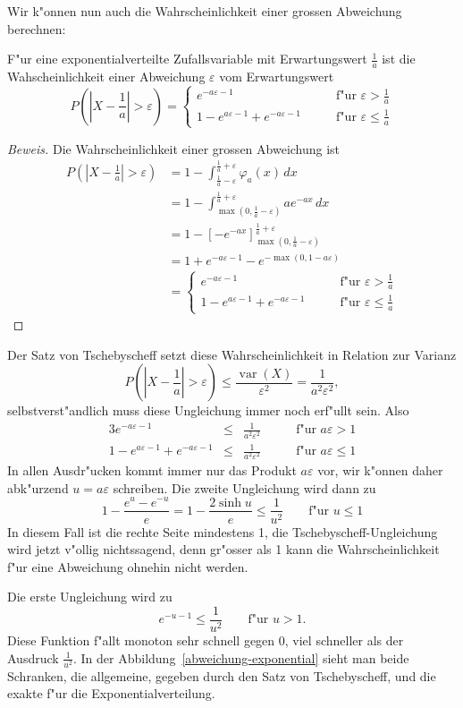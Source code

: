 {
\small
Wir k"onnen nun auch die Wahrscheinlichkeit einer grossen Abweichung
berechnen:
\begin{satz} F"ur eine exponentialverteilte Zufallsvariable mit
Erwartungswert $\frac1a$ ist die Wahscheinlichkeit einer Abweichung
$\varepsilon$ vom Erwartungswert
\[
P(|X-{\textstyle\frac1a}|>\varepsilon)=
\begin{cases}
e^{-a\varepsilon-1}&\qquad\text{f"ur $\varepsilon > \frac1a$}\\
1-e^{a\varepsilon-1}+e^{-a\varepsilon-1}&\qquad\text{f"ur $\varepsilon \le \frac1a$}
\end{cases}
\]
\end{satz}
\begin{proof}[Beweis]
Die Wahrscheinlichkeit einer grossen Abweichung ist
\begin{align*}
P(|X-{\textstyle\frac1a}|>\varepsilon)
&=1-\int_{\frac1a-\varepsilon}^{\frac1a+\varepsilon}\varphi_a(x)\,dx\\
&=1-\int_{\max(0,\frac1a-\varepsilon)}^{\frac1a+\varepsilon}ae^{-ax}\,dx\\
&=1-\left[-e^{-ax}\right]_{\max(0,\frac1a-\varepsilon)}^{\frac1a+\varepsilon}\\
&=1+e^{-a\varepsilon-1}-e^{-\max(0,1-a\varepsilon)}\\
&=\begin{cases}
e^{-a\varepsilon-1}&\qquad\text{f"ur $\varepsilon > \frac1a$}\\
1-e^{a\varepsilon-1}+e^{-a\varepsilon-1}&\qquad\text{f"ur $\varepsilon \le \frac1a$}
\end{cases}
\end{align*}
\end{proof}
Der Satz von Tschebyscheff setzt diese Wahrscheinlichkeit in Relation
zur Varianz
\[
P(|X-{\textstyle\frac1a}|>\varepsilon)\le
\frac{\operatorname{var}(X)}{\varepsilon^2}=\frac{1}{a^2\varepsilon^2},
\]
selbstverst"andlich muss diese Ungleichung immer noch erf"ullt sein.
Also
\begin{alignat*}{3}
e^{-a\varepsilon-1}&\le&\frac1{a^2\varepsilon^2}&\qquad\text{f"ur $a\varepsilon>1$}\\
1-e^{a\varepsilon-1}+e^{-a\varepsilon-1}&\le&\frac1{a^2\varepsilon^2}&\qquad\text{f"ur $a\varepsilon\le1$}
\end{alignat*}
In allen Ausdr"ucken kommt immer nur das Produkt $a\varepsilon$ vor,
wir k"onnen daher
abk"urzend $u=a\varepsilon$ schreiben. Die zweite Ungleichung wird dann zu
\[
1-\frac{e^{u}-e^{-u}}e=1-\frac{2\sinh u}{e}\le\frac1{u^2}\qquad\text{f"ur $u\le1$}
\]
In diesem Fall ist die rechte Seite mindestens 1,
die Tschebyscheff-Ungleichung wird jetzt v"ollig nichtssagend, denn 
gr"osser als 1 kann die Wahrscheinlichkeit f"ur eine Abweichung ohnehin
nicht werden.

Die erste Ungleichung wird zu
\[
e^{-u-1}\le\frac1{u^2}\qquad\text{f"ur $u > 1$}.
\]
Diese Funktion f"allt monoton sehr schnell gegen 0, viel schneller
als der Ausdruck $\frac1{u^2}$. In der Abbildung~\ref{abweichung-exponential}
sieht man beide Schranken, die allgemeine, gegeben durch den
Satz von Tschebyscheff, und die exakte f"ur die Exponentialverteilung.
}

